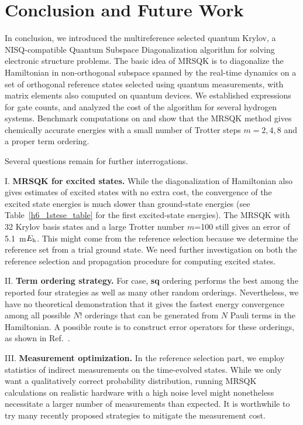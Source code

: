 \documentclass[journal=jctcce,manuscript=article]{achemso}
\newcommand*{\Eh}{$E_{\rm h}$\xspace}
\newcommand{\familyname}[0]{Quantum Subspace Diagonalization\xspace}
\newcommand{\methodname}[0]{multireference selected quantum Krylov\xspace}
\newcommand{\methodabbr}[0]{MRSQK\xspace}
\begin{document}
\section{Conclusion and Future Work}

In conclusion, we introduced the \methodname, a NISQ-compatible \familyname algorithm for solving electronic structure problems.
The basic idea of \methodabbr is to diagonalize the Hamiltonian in non-orthogonal subspace spanned by the real-time dynamics on a set of orthogonal reference states selected using quantum measurements, with matrix elements also computed on quantum devices.
We established expressions for gate counts, and analyzed the cost of the algorithm for several hydrogen systems.
Benchmark computations on  and  show that the \methodabbr method gives chemically accurate energies with a small number of Trotter steps $m=2,4,8$ and a proper term ordering.

Several questions remain for further interrogations. 

I. \textbf{\methodabbr for excited states.} While the diagonalization of Hamiltonian also gives estimates of excited states with no extra cost, the convergence of the excited state energies is much slower than ground-state energies (see Table~\ref{h6_1stese_table} for the first excited-state energies). The \methodabbr with 32 Krylov basis states and a large Trotter number $m$=100 still gives an error of 5.1~m\Eh. This might come from the reference selection because we determine the reference set from a trial ground state. We need further investigation on both the reference selection and propagation procedure for computing excited states. 

II. \textbf{Term ordering strategy.} 
For  case, \textbf{sq} ordering performs the best among the reported four strategies as well as many other random orderings. Nevertheless, we have no theoretical demonstration that it gives the fastest energy convergence among all possible $N!$ orderings that can be generated from $N$ Pauli terms in the Hamiltonian. A possible route is to construct error operators for these orderings, as shown in Ref.~.

III. \textbf{Measurement optimization.} 
In the reference selection part, we employ statistics of indirect measurements on the time-evolved states. While we only want a qualitatively correct probability distribution, running \methodabbr calculations on realistic hardware with a high noise level might nonetheless necessitate a larger number of measurements than expected. 
It is worthwhile to try many recently proposed strategies to mitigate the measurement cost.\cite{Mitarai:2019jv, Izmaylov:2019wa, Izmaylov:2019ik, Gokhale:2019vn, Zhao:2019vz, Gokhale:2019ug}
\end{document}
